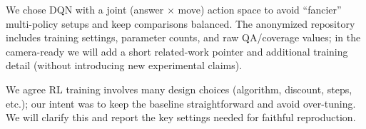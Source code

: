 \documentclass[runningheads]{llncs}
\begin{document}
We chose DQN with a joint (answer $\times$ move) action space to avoid “fancier” multi-policy setups and keep comparisons balanced. The anonymized repository includes training settings, parameter counts, and raw QA/coverage values; in the camera-ready we will add a short related-work pointer and additional training detail (without introducing new experimental claims).

We agree RL training involves many design choices (algorithm, discount, steps, etc.); our intent was to keep the baseline straightforward and avoid over-tuning. We will clarify this and report the key settings needed for faithful reproduction.





\end{document}

